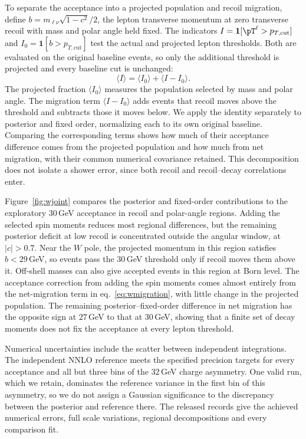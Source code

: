 To separate the acceptance into a projected population and recoil migration, define $b=m_{\ell\nu}\sqrt{1-c^2}/2$, the lepton transverse momentum at zero transverse recoil with mass and polar angle held fixed. The indicators $I=\mathbf 1[\pT^\ell>p_{T,\mathrm{cut}}]$ and $I_0=\mathbf 1[b>p_{T,\mathrm{cut}}]$ test the actual and projected lepton thresholds. Both are evaluated on the original baseline events, so only the additional threshold is projected and every baseline cut is unchanged:
\begin{equation}
\langle I\rangle=\langle I_0\rangle+\langle I-I_0\rangle.
\label{eq:wmigration}
\end{equation}
The projected fraction $\langle I_0\rangle$ measures the population selected by mass and polar angle. The migration term $\langle I-I_0\rangle$ adds events that recoil moves above the threshold and subtracts those it moves below. We apply the identity separately to posterior and fixed order, normalizing each to its own original baseline. Comparing the corresponding terms shows how much of their acceptance difference comes from the projected population and how much from net migration, with their common numerical covariance retained. This decomposition does not isolate a shower error, since both recoil and recoil--decay correlations enter.

Figure~\ref{fig:wjoint} compares the posterior and fixed-order contributions to the exploratory $30\,$GeV acceptance in recoil and polar-angle regions. Adding the selected spin moments reduces most regional differences, but the remaining posterior deficit at low recoil is concentrated outside the angular window, at $|c|>0.7$. Near the $W$ pole, the projected momentum in this region satisfies $b<29\,$GeV, so events pass the $30\,$GeV threshold only if recoil moves them above it. Off-shell masses can also give accepted events in this region at Born level. The acceptance correction from adding the spin moments comes almost entirely from the net-migration term in eq.~\eqref{eq:wmigration}, with little change in the projected population. The remaining posterior--fixed-order difference in net migration has the opposite sign at $27\,$GeV to that at $30\,$GeV, showing that a finite set of decay moments does not fix the acceptance at every lepton threshold.

Numerical uncertainties include the scatter between independent integrations. The independent NNLO reference meets the specified precision targets for every acceptance and all but three bins of the $32\,$GeV charge asymmetry. One valid run, which we retain, dominates the reference variance in the first bin of this asymmetry, so we do not assign a Gaussian significance to the discrepancy between the posterior and reference there. The released records give the achieved numerical errors, full scale variations, regional decompositions and every comparison fit.

